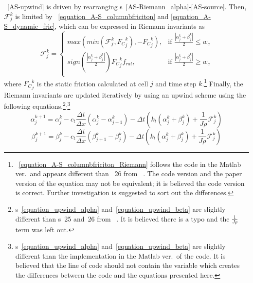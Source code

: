 \equationname~\ref{AS-upwind} is driven by rearranging \equationname{}s~\ref{AS-Riemann_alpha}-\ref{AS-source}. Then, $\mathcal{F}_{j}^k$ is limited by \equationname~\ref{equation_A-S_columnbfriciton} and \ref{equation_A-S_dynamic_fric}, which can be expressed in Riemann invariants as
\begin{equation}
	\label{equation_A-S_columnbfriciton_Riemann}
	\mathcal{F}_{j}^k =
	\begin{cases}
		max(min(\mathcal{F}_{j}^k,{F_C}_j^k),-{F_C}_j^k) , & \mbox{if } \frac{|\alpha_j^k + \beta_j^k|}{2} \le w_c \\
		sign\left(\frac{|\alpha_j^k + \beta_j^k|}{2}\right) {F_C}_j^k f_{rat} , & \mbox{if } \frac{|\alpha_j^k + \beta_j^k|}{2} \ge w_c \\
	\end{cases}
\end{equation}
where ${F_C}_j^k$ is the static friction calculated at cell $j$ and time step $k$.\footnote{\equationname~\ref{equation_A-S_columnbfriciton_Riemann} follows the code in the Matlab ver.\ and appears different than \equationname~26 from ~\cite{ref:aarsnes2017a}. The code version and the paper version of the equation may not be equivalent; it is believed the code version is correct.  Further investigation is suggested to sort out the differences.} Finally, the Riemann invariants are updated iteratively by using an upwind scheme using the following equations.\footnote{\equationname{}s~\ref{equation_upwind_alpha} and~\ref{equation_upwind_beta} are slightly different than \equationname{}s~25 and~26 from ~\cite{ref:aarsnes2017a}. It is believed there is a typo and the $\frac{1}{J \rho}$ term was left out.}$^,$\footnote{\equationname{}s~\ref{equation_upwind_alpha} and~\ref{equation_upwind_beta} are slightly different than the implementation in the Matlab ver.\ of the code. It is believed that the line of code  should not contain the  variable which creates the differences between the code and the equations presented here.}
\begin{equation}
	\label{equation_upwind_alpha}
	\alpha_j^{k+1} = \alpha_j^{k} - c_t \frac{\Delta t}{\Delta x}(\alpha_j^k - \alpha_{j-1}^k) - \Delta t \left( k_t (\alpha_j^k + \beta_j^k) + \frac{1}{J \rho} \mathcal{F}_j^k \right)
\end{equation}
\begin{equation}
	\label{equation_upwind_beta}
	\beta_j^{k+1} = \beta_j^{k} - c_t \frac{\Delta t}{\Delta x}(\beta_{j+1}^k - \beta_{j}^k) - \Delta t \left( k_t (\alpha_j^k + \beta_j^k) + \frac{1}{J \rho} \mathcal{F}_j^k \right)
\end{equation}

